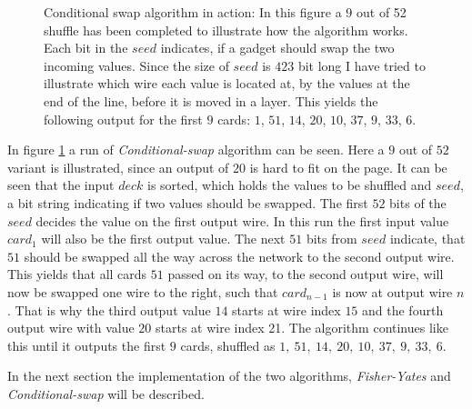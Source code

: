 \documentclass[twoside,11pt,openright]{report}
\newcommand{\FY}{\textit{Fisher-Yates} }
\newcommand{\CS}{\textit{Conditional-swap} }
\begin{document}
\bigskip

\begin{figure}[t]
\centering
\scalebox{1.5}{}
\caption{Conditional swap algorithm in action: In this figure a 9 out of 52 shuffle has been completed to illustrate how the algorithm works. Each bit in the $seed$ indicates, if a gadget should swap the two incoming values. Since the size of $seed$ is $423$ bit long I have tried to illustrate which wire each value is located at, by the values at the end of the line, before it is moved in a layer. This yields the following output for the first $9$ cards: $1$, $51$, $14$, $20$, $10$, $37$, $9$, $33$, $6$.}
\label{fig:con_swap}
\end{figure}

In figure \ref{fig:con_swap} a run of \CS algorithm can be seen. Here a $9$ out of $52$ variant is illustrated, since an output of $20$ is hard to fit on the page. It can be seen that the input $deck$ is sorted, which holds the values to be shuffled and $seed$, a bit string indicating if two values should be swapped. The first $52$ bits of the $seed$ decides the value on the first output wire. In this run the first input value $card_1$ will also be the first output value. The next $51$ bits from $seed$ indicate, that $51$ should be swapped all the way across the network to the second output wire. This yields that all cards $51$ passed on its way, to the second output wire, will now be swapped one wire to the right, such that $card_{n-1}$ is now at output wire $n$. That is why the third output value $14$ starts at wire index $15$ and the fourth output wire with value $20$ starts at wire index 21. The algorithm continues like this until it outputs the first $9$ cards, shuffled as $1,~51,~14,~20,~10,~37,~9,~33,~6$.

\bigskip

In the next section the implementation of the two algorithms, \FY and \CS will be described.

\end{document}

